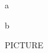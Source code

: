 \documentclass[12pt,letterpaper,twoside,twocolumn,draft,showtrims]{memoir} %
\begin{document}
\newpage
a


\newpage
b
\newpage

PICTURE
\end{document}
